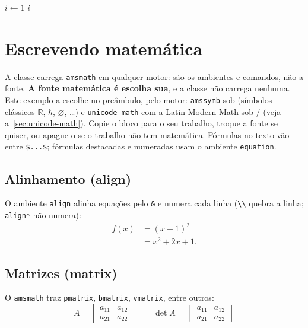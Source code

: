 \documentclass[dsc,pdfa]{coppe}
\begin{document}
\begin{algorithm}[H]
\caption{Busca sequencial em um vetor}
\label{alg:busca}
$i \leftarrow 1$\;
\Retorna $i$\;
\end{algorithm}

  \chapter{Escrevendo matemática}

  A classe carrega \texttt{amsmath} em qualquer motor: são os ambientes e comandos, não a fonte. \textbf{A fonte matemática é escolha sua}, e a classe não carrega nenhuma. Este exemplo a escolhe no preâmbulo, pelo motor: \texttt{amssymb} sob  (símbolos clássicos $\mathbb{R}$, $\hbar$, $\varnothing$, \ldots) e \texttt{unicode-math} com a Latin Modern Math sob / (veja a~\autoref{sec:unicode-math}). Copie o bloco para o seu trabalho, troque a fonte se quiser, ou apague-o se o trabalho não tem matemática. Fórmulas no texto vão entre \verb|$...$|; fórmulas destacadas e numeradas usam o ambiente \verb|equation|.

  \section{Alinhamento (align)}
  O ambiente \verb|align| alinha equações pelo \verb|&| e numera cada linha (\verb|\\| quebra a linha; \verb|align*| não numera):
  \begin{align}
    f(x) &= (x+1)^2 \\
         &= x^2 + 2x + 1 .
  \end{align}

  \section{Matrizes (matrix)}
  O \texttt{amsmath} traz \verb|pmatrix|, \verb|bmatrix|, \verb|vmatrix|, entre outros:
  \begin{equation}
    A = \begin{bmatrix} a_{11} & a_{12} \\ a_{21} & a_{22} \end{bmatrix}
    \qquad
    \det A = \begin{vmatrix} a_{11} & a_{12} \\ a_{21} & a_{22} \end{vmatrix}
  \end{equation}
\end{document}
